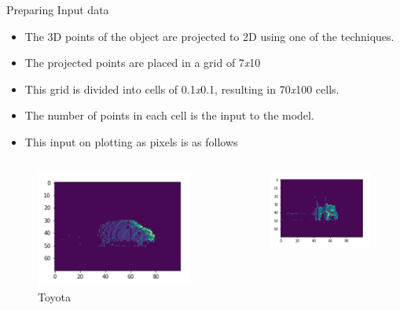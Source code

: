 \documentclass[9pt]{beamer}
\begin{document}
\begin{frame}[fragile]{Preparing Input data}
	\begin{itemize}
		\item The 3D points of the object are projected to 2D using one of the techniques.
		\item The projected points are placed in a grid of 7\textit{x}10
		\item This grid is divided into cells of 0.1\textit{x}0.1, resulting in 70\textit{x}100 cells.
		\item The number of points in each cell is the input to the model.
		\item This input on plotting as pixels is as follows
	\end{itemize}

	\begin{columns}
		\begin{column}{0.33\textwidth}
			\begin{figure}
				\centering
				\includegraphics[width=\textwidth]{images/Toyota.png}
				\caption{Toyota}
			\end{figure}
		\end{column}
		\begin{column}{0.33\textwidth}
			\begin{figure}
				\centering
				\includegraphics[width=\textwidth]{images/Tractor.png}		

\end{figure}
\end{column}
\end{columns}
\end{frame}
\end{document}
